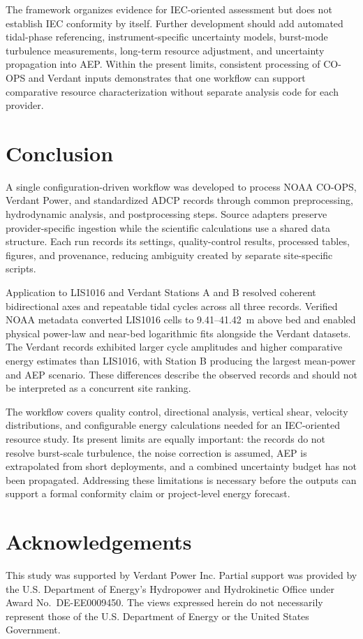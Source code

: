 \documentclass[12pt,sort&compress]{elsarticle}
\begin{document}
The framework organizes evidence for IEC-oriented assessment but does not establish IEC conformity by itself. Further development should add automated tidal-phase referencing, instrument-specific uncertainty models, burst-mode turbulence measurements, long-term resource adjustment, and uncertainty propagation into AEP. Within the present limits, consistent processing of CO-OPS and Verdant inputs demonstrates that one workflow can support comparative resource characterization without separate analysis code for each provider.

\section{Conclusion}
\label{sec:conclusion}

A single configuration-driven workflow was developed to process NOAA CO-OPS, Verdant Power, and standardized ADCP records through common preprocessing, hydrodynamic analysis, and postprocessing steps. Source adapters preserve provider-specific ingestion while the scientific calculations use a shared data structure. Each run records its settings, quality-control results, processed tables, figures, and provenance, reducing ambiguity created by separate site-specific scripts.

Application to LIS1016 and Verdant Stations A and B resolved coherent bidirectional axes and repeatable tidal cycles across all three records. Verified NOAA metadata converted LIS1016 cells to 9.41--41.42~m above bed and enabled physical power-law and near-bed logarithmic fits alongside the Verdant datasets. The Verdant records exhibited larger cycle amplitudes and higher comparative energy estimates than LIS1016, with Station B producing the largest mean-power and AEP scenario. These differences describe the observed records and should not be interpreted as a concurrent site ranking.

The workflow covers quality control, directional analysis, vertical shear, velocity distributions, and configurable energy calculations needed for an IEC-oriented resource study. Its present limits are equally important: the records do not resolve burst-scale turbulence, the noise correction is assumed, AEP is extrapolated from short deployments, and a combined uncertainty budget has not been propagated. Addressing these limitations is necessary before the outputs can support a formal conformity claim or project-level energy forecast.

\section*{Acknowledgements}
This study was supported by Verdant Power Inc. Partial support was provided by the U.S. Department of Energy's Hydropower and Hydrokinetic Office under Award No.~DE-EE0009450. The views expressed herein do not necessarily represent those of the U.S. Department of Energy or the United States Government.
\end{document}
